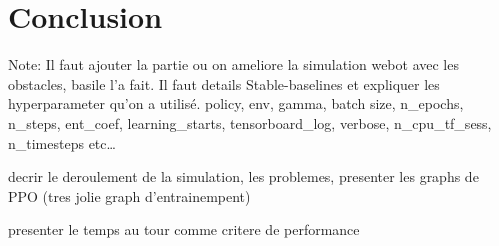 \documentclass[french]{article}
\begin{document}
\section{Conclusion}

Note:
Il faut ajouter la partie ou on ameliore la simulation webot avec les obstacles, basile l'a fait.
Il faut details Stable-baselines et expliquer les hyperparameter qu'on a utilisé.
policy, env, gamma, batch size, n\_epochs, n\_steps, ent\_coef, learning\_starts, tensorboard\_log, verbose, 
n\_cpu\_tf\_sess, n\_timesteps etc\dots

decrir le deroulement de la simulation, les problemes, presenter les graphs
de PPO (tres jolie graph d'entrainempent)

presenter le temps au tour comme critere de performance
\end{document}
